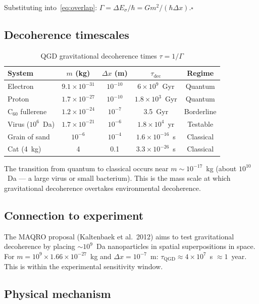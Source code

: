 \documentclass[11pt,a4paper]{article}
\theoremstyle{plain}
\theoremstyle{definition}
\theoremstyle{remark}
\begin{document}
Substituting into~\eqref{eq:overlap}: $\Gamma = \Delta E_\sigma/\hbar = Gm^2/(\hbar\Delta x)$.\hfill$\square$

\subsection{Decoherence timescales}

\begin{table}[h]
  \centering
  \caption{QGD gravitational decoherence times $\tau = 1/\Gamma$}
  \renewcommand{\arraystretch}{1.3}
  \begin{tabular}{@{}lcccc@{}}
    \toprule
    System & $m$ (kg) & $\Delta x$ (m) & $\tau_{\mathrm{dec}}$ & Regime \\
    \midrule
    Electron & $9.1\times10^{-31}$ & $10^{-10}$ & $6\times10^{9}$~Gyr & Quantum \\
    Proton & $1.7\times10^{-27}$ & $10^{-10}$ & $1.8\times10^{3}$~Gyr & Quantum \\
    C$_{60}$ fullerene & $1.2\times10^{-24}$ & $10^{-7}$ & 3.5~Gyr & Borderline \\
    Virus ($10^6$~Da) & $1.7\times10^{-21}$ & $10^{-6}$ & $1.8\times10^{4}$~yr & Testable \\
    Grain of sand & $10^{-6}$ & $10^{-4}$ & $1.6\times10^{-16}$~s & Classical \\
    Cat (4~kg) & 4 & 0.1 & $3.3\times10^{-26}$~s & Classical \\
    \bottomrule
  \end{tabular}
\end{table}

The transition from quantum to classical occurs near $m \sim 10^{-17}$~kg (about $10^{10}$~Da --- a large virus or small bacterium).  This is the mass scale at which gravitational decoherence overtakes environmental decoherence.

\subsection{Connection to experiment}

The MAQRO proposal (Kaltenbaek et al.\ 2012) aims to test gravitational decoherence by placing $\sim10^9$~Da nanoparticles in spatial superpositions in space.  For $m = 10^9 \times 1.66\times10^{-27}$~kg and $\Delta x = 10^{-7}$~m: $\tau_{\mathrm{QGD}} \approx 4\times10^{7}$~s $\approx 1$~year.  This is within the experimental sensitivity window.

\subsection{Physical mechanism}
\end{document}
